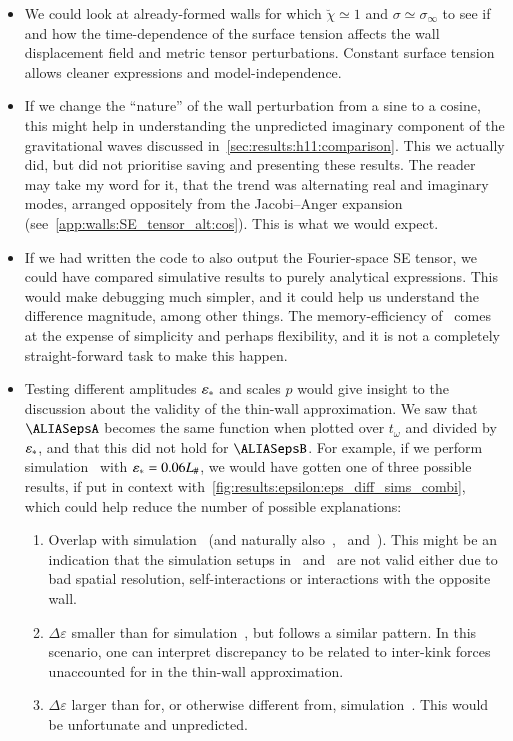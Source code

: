     \begin{itemize}
        \item We could look at already-formed walls for which $\breve{\chi}\simeq 1$ and  $\sigma \simeq \sigma_\infty$ to see if and how the time-dependence of the surface tension affects the wall displacement field and metric tensor perturbations. Constant surface tension allows cleaner expressions and model-independence. 
        \item If we change the ``nature'' of the wall perturbation from a sine to a cosine, this might help in understanding the unpredicted imaginary component of the gravitational waves discussed in~\cref{sec:results:h11:comparison}. This we actually did, but did not prioritise saving and presenting these results. The reader may take my word for it, that the trend was alternating real and imaginary modes, arranged oppositely from the Jacobi--Anger expansion (see~\cref{app:walls:SE_tensor_alt:cos}). This is what we would expect. %
        \item If we had written the code to also output the Fourier-space SE tensor, we could have compared simulative results to purely analytical expressions. This would make debugging much simpler, and it could help us understand the difference magnitude, among other things. The memory-efficiency of~\gevolution{} comes at the expense of simplicity and perhaps flexibility, and it is not a completely straight-forward task to make this happen.
        \item Testing different amplitudes $\varepsilon_\ast$ and scales $p$ would give insight to the discussion about the validity of the thin-wall approximation. We saw that $\epsA$ becomes the same function when plotted over $t_\omega$ and divided by $\varepsilon_\ast$, and that this did not hold for $\epsB$. For example, if we perform simulation~ with $\varepsilon_\ast=0.06L_\#$, we would have gotten one of three possible results, if put in context with~\cref{fig:results:epsilon:eps_diff_sims_combi}, which could help reduce the number of possible explanations: %
        \begin{enumerate}
            \item Overlap with simulation~ (and naturally also~,~ and~). This might be an indication that the simulation setups in~ and~ are not valid either due to bad spatial resolution, self-interactions or interactions with the opposite wall.
            \item $\Delta \varepsilon$ smaller than for simulation~, but follows a similar pattern. In this scenario, one can interpret discrepancy to be related to inter-kink forces unaccounted for in the thin-wall approximation.
            \item $\Delta \varepsilon$ larger than for, or otherwise different from, simulation~. This would be unfortunate and unpredicted.
        \end{enumerate}
    \end{itemize}

